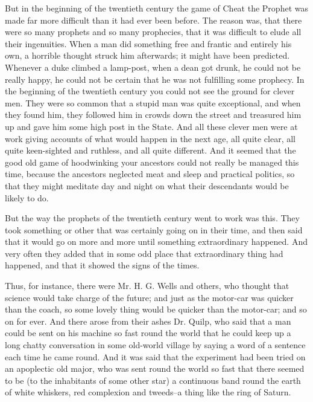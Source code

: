 \documentclass{book}
\begin{document}
But in the beginning of the twentieth century the game of Cheat the Prophet was made far more difficult than it had ever been before. The reason was, that there were so many prophets and so many prophecies, that it was difficult to elude all their ingenuities. When a man did something free and frantic and entirely his own, a horrible thought struck him afterwards; it might have been predicted. Whenever a duke climbed a lamp-post, when a dean got drunk, he could not be really happy, he could not be certain that he was not fulfilling some prophecy. In the beginning of the twentieth century you could not see the ground for clever men. They were so common that a stupid man was quite exceptional, and when they found him, they followed him in crowds down the street and treasured him up and gave him some high post in the State. And all these clever men were at work giving accounts of what would happen in the next age, all quite clear, all quite keen-sighted and ruthless, and all quite different. And it seemed that the good old game of hoodwinking your ancestors could not really be managed this time, because the ancestors neglected meat and sleep and practical politics, so that they might meditate day and night on what their descendants would be likely to do.

But the way the prophets of the twentieth century went to work was this. They took something or other that was certainly going on in their time, and then said that it would go on more and more until something extraordinary happened. And very often they added that in some odd place that extraordinary thing had happened, and that it showed the signs of the times.

Thus, for instance, there were Mr. H. G. Wells and others, who thought that science would take charge of the future; and just as the motor-car was quicker than the coach, so some lovely thing would be quicker than the motor-car; and so on for ever. And there arose from their ashes Dr. Quilp, who said that a man could be sent on his machine so fast round the world that he could keep up a long chatty conversation in some old-world village by saying a word of a sentence each time he came round. And it was said that the experiment had been tried on an apoplectic old major, who was sent round the world so fast that there seemed to be (to the inhabitants of some other star) a continuous band round the earth of white whiskers, red complexion and tweeds–a thing like the ring of Saturn.
\end{document}
